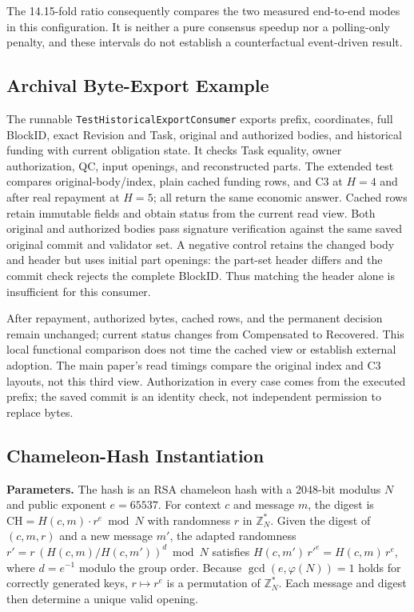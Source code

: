 The 14.15-fold ratio consequently compares the two measured
end-to-end modes in this configuration. It is neither a pure consensus
speedup nor a polling-only penalty, and these intervals do not establish
a counterfactual event-driven result.

\subsection{Archival Byte-Export Example}
The runnable \texttt{TestHistoricalExportConsumer} exports prefix,
coordinates, full BlockID, exact Revision and Task, original and authorized
bodies, and historical funding with current obligation state. It checks
Task equality, owner authorization, QC, input openings, and reconstructed
parts. The extended test compares original-body/index, plain cached
funding rows, and C3 at $H=4$ and after real repayment at $H=5$; all return
the same economic answer. Cached rows retain immutable fields and obtain
status from the current read view. Both original and authorized bodies
pass signature verification against the same saved original commit and
validator set. A negative control retains the changed body and header
but uses initial part openings: the part-set header differs and the
commit check rejects the complete BlockID. Thus matching the header
alone is insufficient for this consumer.

After repayment, authorized bytes, cached rows, and the permanent decision
remain unchanged; current status changes from Compensated to Recovered.
This local functional comparison does not time the cached view or establish
external adoption. The main paper's read timings compare the original
index and C3 layouts, not this third view. Authorization in every case
comes from the executed prefix; the saved commit is an identity check,
not independent permission to replace bytes.

\subsection{Chameleon-Hash Instantiation}
\label{sec:ch-params}

\noindent\textbf{Parameters.} The hash is an RSA chameleon hash with a 2048-bit modulus $N$ and public exponent $e=65537$. For context $c$ and message $m$, the digest is $\mathrm{CH}=H(c,m)\cdot r^{e}\bmod N$ with randomness $r$ in $\mathbb{Z}_N^{*}$. Given the digest of $(c,m,r)$ and a new message $m'$, the adapted randomness $r'=r\,(H(c,m)/H(c,m'))^{d}\bmod N$ satisfies $H(c,m')\,r'^{e}=H(c,m)\,r^{e}$, where $d=e^{-1}$ modulo the group order. Because $\gcd(e,\varphi(N))=1$ holds for correctly generated keys, $r\mapsto r^e$ is a permutation of $\mathbb{Z}_N^{*}$. Each message and digest then determine a unique valid opening.

